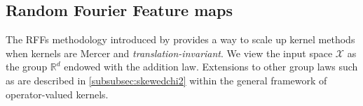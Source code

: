 \documentclass[twoside,11pt]{article}
\begin{document}
\subsection{Random Fourier Feature maps}
The \aclp{RFF} methodology introduced  by \citet{Rahimi2007} provides a way to
scale up kernel methods when kernels are Mercer and
\emph{translation-invariant}.  We view the input space $\mathcal{X}$ as the
group $\mathbb{R}^d$ endowed with the addition law. Extensions to other group
laws such as \citet{li2010random} are described in \cref{subsubsec:skewedchi2}
within the general framework of operator-valued kernels.
\end{document}
